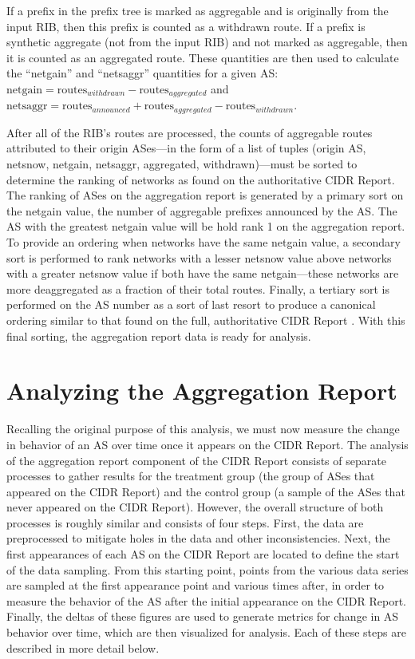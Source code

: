 If a prefix in the prefix tree is marked as aggregable and is originally from the input RIB, then this prefix is counted as a withdrawn route. If a prefix is synthetic aggregate (not from the input RIB) and not marked as aggregable, then it is counted as an aggregated route. These quantities are then used to calculate the ``netgain'' and ``netsaggr'' quantities for a given AS: $\textrm{netgain}=\textrm{routes}_{withdrawn} - \textrm{routes}_{aggregated}$ and $\textrm{netsaggr}=\textrm{routes}_{announced} + \textrm{routes}_{aggregated} - \textrm{routes}_{withdrawn}$.

After all of the RIB's routes are processed, the counts of aggregable routes attributed to their origin ASes---in the form of a list of tuples (origin AS, netsnow, netgain, netsaggr, aggregated, withdrawn)---must be sorted to determine the ranking of networks as found on the authoritative CIDR Report. The ranking of ASes on the aggregation report is generated by a primary sort on the netgain value, the number of aggregable prefixes announced by the AS. The AS with the greatest netgain value will be hold rank 1 on the aggregation report. To provide an ordering when networks have the same netgain value, a secondary sort is performed to rank networks with a lesser netsnow value above networks with a greater netsnow value if both have the same netgain---these networks are more deaggregated as a fraction of their total routes. Finally, a tertiary sort is performed on the AS number as a sort of last resort to produce a canonical ordering similar to that found on the full, authoritative CIDR Report \cite{cidr-report-full}. With this final sorting, the aggregation report data is ready for analysis.

\section{Analyzing the Aggregation Report}

Recalling the original purpose of this analysis, we must now measure the change in behavior of an AS over time once it appears on the CIDR Report. The analysis of the aggregation report component of the CIDR Report consists of separate processes to gather results for the treatment group (the group of ASes that appeared on the CIDR Report) and the control group (a sample of the ASes that never appeared on the CIDR Report). However, the overall structure of both processes is roughly similar and consists of four steps. First, the data are preprocessed to mitigate holes in the data and other inconsistencies. Next, the first appearances of each AS on the CIDR Report are located to define the start of the data sampling. From this starting point, points from the various data series are sampled at the first appearance point and various times after, in order to measure the behavior of the AS after the initial appearance on the CIDR Report. Finally, the deltas of these figures are used to generate metrics for change in AS behavior over time, which are then visualized for analysis. Each of these steps are described in more detail below.

